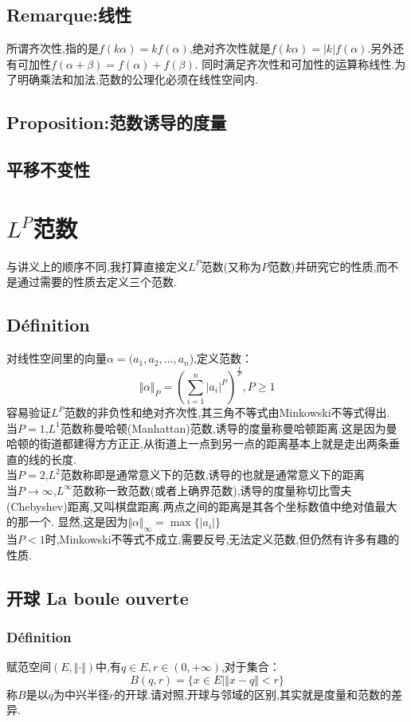 \documentclass[12pt, a4paper, oneside]{ctexbook}
\begin{document}
  \subsection{Remarque:线性}
  所谓齐次性,指的是$f(k\alpha)=kf(\alpha)$,绝对齐次性就是$f(k\alpha)= | k | f(\alpha)$.另外还有可加性$f(\alpha+\beta)=f(\alpha)+f(\beta)$.
  同时满足齐次性和可加性的运算称线性.为了明确乘法和加法,范数的公理化必须在线性空间内.
  \subsection{Proposition:范数诱导的度量}
  \subsection{平移不变性}


\section{$L^P$范数}\label{myref:LPnorme}
与讲义上的顺序不同,我打算直接定义$L^P$范数(又称为$P$范数)并研究它的性质,而不是通过需要的性质去定义三个范数.
  \subsection{Définition}
  对线性空间里的向量$\alpha=(a_1,a_2,\dots,a_n$),定义范数：
  $$
    \Vert \alpha\Vert_P=(\sum_{i=1}^{n}|a_i|^P)^{\frac{1}{P}},P\ge1  
  $$
  容易验证$L^P$范数的非负性和绝对齐次性,其三角不等式由Minkowski不等式得出.\\
  当$P=1$,$L^1$范数称曼哈顿(Manhattan)范数,诱导的度量称曼哈顿距离.这是因为曼哈顿的街道都建得方方正正,从街道上一点到另一点的距离基本上就是走出两条垂直的线的长度.\\
  当$P=2$,$L^2$范数称即是通常意义下的范数,诱导的也就是通常意义下的距离\\
  当$P\rightarrow \infty$,$L^\infty$范数称一致范数(或者上确界范数),诱导的度量称切比雪夫(Chebyshev)距离,又叫棋盘距离.两点之间的距离是其各个坐标数值中绝对值最大的那一个.
  显然,这是因为$\Vert \alpha\Vert_\infty=\max\{|a_i|\}$\\
  当$P<1$时,Minkowski不等式不成立,需要反号,无法定义范数,但仍然有许多有趣的性质.
  \subsection{开球 La boule ouverte}
  \subsubsection{Définition}
  赋范空间$(E,\Vert \cdot \Vert)$中,有$q\in E,r\in(0,+\infty)$,对于集合：
  $$
    B(q,r)=\{x\in E |\Vert x-q \Vert<r \}
  $$
  称$B$是以$q$为中兴半径$r$的开球.请对照,开球与邻域的区别,其实就是度量和范数的差异.
\end{document}
